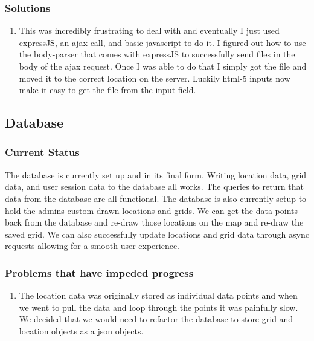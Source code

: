 \documentclass[letterpaper,10pt,serif,titlepage, onecolumn, compsoc]{IEEEtran}
\begin{document}
\subsubsection{Solutions}
\begin{enumerate}
\item This was incredibly frustrating to deal with and eventually I just used expressJS, an ajax call, and basic javascript to do it. I figured out how to use the body-parser that comes with expressJS to successfully send files in the body of the ajax request. Once I was able to do that I simply got the file and moved it to the correct location on the server. Luckily html-5 inputs now make it easy to get the file from the input field. 
\end{enumerate}


\subsection{Database}
\subsubsection{Current Status}
The database is currently set up and in its final form. Writing location data, grid data, and user session data to the database all works. The queries to return that data from the database are all functional. The database is also currently setup to hold the admins custom drawn locations and grids. We can get the data points back from the database and re-draw those locations on the map and re-draw the saved grid. We can also successfully update locations and grid data through async requests allowing for a smooth user experience. 

\subsubsection{Problems that have impeded progress}
\begin{enumerate}
\item The location data was originally stored as individual data points and when we went to pull the data and loop through the points it was painfully slow. We decided that we would need to refactor the database to store grid and location objects as a json objects.
\end{enumerate}
\end{document}
